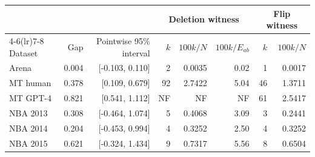 \begin{tabular}{lrr rrr rr}\toprule & & & \multicolumn{3}{c}{Deletion witness} & \multicolumn{2}{c}{Flip witness} \\ \cmidrule(lr){4-6}\cmidrule(lr){7-8} Dataset & Gap & Pointwise 95\% interval & $k$ & $100k/N$ & $100k/E_{ab}$ & $k$ & $100k/N$ \\ \midrule
Arena & 0.004 & [-0.103, 0.110] & 2 & 0.0035 & 0.02 & 1 & 0.0017 \\
MT human & 0.378 & [0.109, 0.679] & 92 & 2.7422 & 5.04 & 46 & 1.3711 \\
MT GPT-4 & 0.821 & [0.541, 1.112] & NF & NF & NF & 61 & 2.5417 \\
NBA 2013 & 0.308 & [-0.464, 1.074] & 5 & 0.4068 & 3.09 & 3 & 0.2441 \\
NBA 2014 & 0.204 & [-0.453, 0.994] & 4 & 0.3252 & 2.50 & 4 & 0.3252 \\
NBA 2015 & 0.621 & [-0.324, 1.434] & 9 & 0.7317 & 5.56 & 8 & 0.6504 \\
\bottomrule
\end{tabular}
